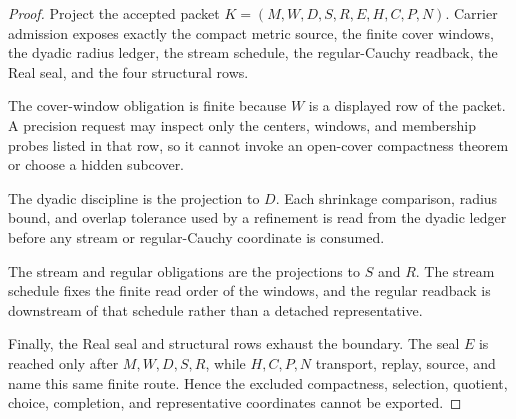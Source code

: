 \begin{proof}
Project the accepted packet $K=(M,W,D,S,R,E,H,C,P,N)$. Carrier admission exposes exactly the compact metric source, the finite cover windows, the dyadic radius ledger, the stream schedule, the regular-Cauchy readback, the Real seal, and the four structural rows.

The cover-window obligation is finite because $W$ is a displayed row of the packet. A precision request may inspect only the centers, windows, and membership probes listed in that row, so it cannot invoke an open-cover compactness theorem or choose a hidden subcover.

The dyadic discipline is the projection to $D$. Each shrinkage comparison, radius bound, and overlap tolerance used by a refinement is read from the dyadic ledger before any stream or regular-Cauchy coordinate is consumed.

The stream and regular obligations are the projections to $S$ and $R$. The stream schedule fixes the finite read order of the windows, and the regular readback is downstream of that schedule rather than a detached representative.

Finally, the Real seal and structural rows exhaust the boundary. The seal $E$ is reached only after $M,W,D,S,R$, while $H,C,P,N$ transport, replay, source, and name this same finite route. Hence the excluded compactness, selection, quotient, choice, completion, and representative coordinates cannot be exported.
\end{proof}

